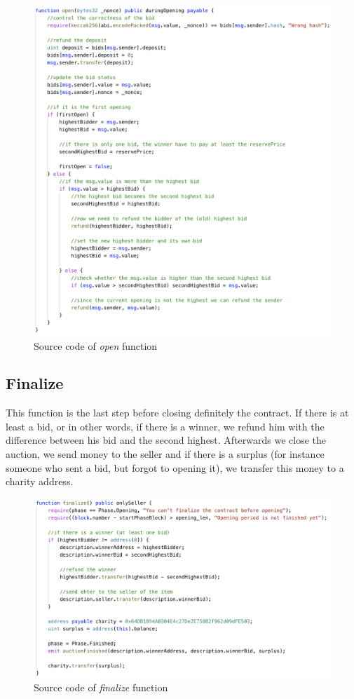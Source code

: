 \documentclass[runningheads,a4paper]{llncs}
\begin{document}
\begin{figure}[h]
\includegraphics[width=0.92\linewidth]{images/opening.png}
\centering
\caption{Source code of \emph{open} function}
\label{fig:vickreyOpen}
\end{figure}


\newpage
\subsection{Finalize}
This function is the last step before closing definitely the contract. If there is at least a bid, or in other words, if there is a winner, we refund him with the difference between his bid and the second highest. Afterwards we close the auction, we send money to the seller and if there is a surplus (for instance someone who sent a bid, but forgot to opening it), we transfer this money to a charity address.

\begin{figure}[h]
\includegraphics[width=0.85\linewidth]{images/finalize.png}
\centering
\caption{Source code of \emph{finalize} function}
\label{fig:vickreyFinalize}
\end{figure}
\end{document}
